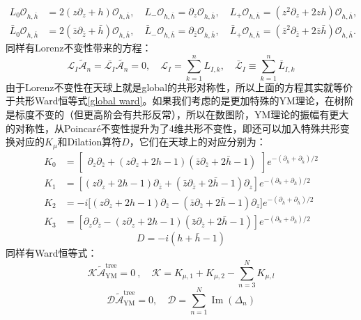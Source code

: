 \begin{equation}
	\begin{aligned}L_0\mathcal{O}_{h,\bar{h}}&=2(z\partial_z+h)\mathcal{O}_{h,\bar{h}},\quad L_-\mathcal{O}_{h,\bar{h}}=\partial_z\mathcal{O}_{h,\bar{h}},\quad L_+\mathcal{O}_{h,\bar{h}}=(z^2\partial_z+2zh)\mathcal{O}_{h,\bar{h}},\\\bar{L}_0\mathcal{O}_{h,\bar{h}}&=2(\bar{z}\partial_{\bar{z}}+\bar{h})\mathcal{O}_{h,\bar{h}},\quad\bar{L}_-\mathcal{O}_{h,\bar{h}}=\partial_{\bar{z}}\mathcal{O}_{h,\bar{h}},\quad\bar{L}_+\mathcal{O}_{h,\bar{h}}=(\bar{z}^2\partial_{\bar{z}}+2\bar{z}\bar{h})\mathcal{O}_{h,\bar{h}}.\end{aligned}
\end{equation}
同样有Lorenz不变性带来的方程：
\begin{equation}\label{50.10}
	\boxed{
		\mathcal{L}_I\widetilde{\mathcal{A}}_n=\bar{\mathcal{L}_I}\widetilde{\mathcal{A}_n}=0,\quad \mathcal{L}_I=\sum_{k=1}^nL_{I,k},\quad\bar{\mathcal{L}}_I\equiv\sum_{k=1}^n\bar{L}_{I,k}
	}
\end{equation}
由于Lorenz不变性在天球上就是global的共形对称性，所以上面的方程其实就等价于共形Ward恒等式\ref{global ward}。如果我们考虑的是更加特殊的YM理论，在树阶是标度不变的（但更高阶会有共形反常），所以在数图阶，YM理论的振幅有更大的对称性，从Poincar\'e不变性提升为了4维共形不变性，即还可以加入特殊共形变换对应的$K_\mu$和Dilation算符$D$，它们在天球上的对应分别为：
\begin{equation}
	\begin{aligned}
		{K_0} &=\begin{bmatrix}\partial_z\partial_{\bar{z}}+(z\partial_z+2h-1)(\bar{z}\partial_{\bar{z}}+2\bar{h}-1)\end{bmatrix}e^{-(\partial_{\bar{h}}+\partial_{\bar{h}})/2} \\
		{K_1}& =\left[(z\partial_z+2h-1)\partial_{\bar{z}}+(\bar{z}\partial_{\bar{z}}+2\bar{h}-1)\partial_z\right]e^{-(\partial_h+\partial_{\bar{h}})/2} \\
		{K_2} &=-i\big[(z\partial_z+2h-1)\partial_{\bar{z}}-(\bar{z}\partial_{\bar{z}}+2\bar{h}-1)\partial_z\big]e^{-(\partial_{\bar{h}}+\partial_{\bar{h}})/2} \\
		{K_3} &=\left[\partial_z\partial_{\bar{z}}-(z\partial_z+2h-1)(\bar{z}\partial_{\bar{z}}+2\bar{h}-1)\right]e^{-(\partial_h+\partial_{\bar{h}})/2}
	\end{aligned}
\end{equation}
\begin{equation}
	D=-i(h+\bar{h}-1)
\end{equation}
同样有Ward恒等式：
\begin{equation}
	\mathcal{K}\widetilde{\mathcal{A}}^{\text{tree}}_\mathrm{YM}=0\mathrm{~},\quad\mathcal{K}=K_{\mu,1}+K_{\mu,2}-\sum_{n=3}^NK_{\mu,l}
\end{equation}
\begin{equation}
	\mathcal{D}\widetilde{\mathcal{A}}_\mathrm{YM}^\text{tree}=0,\quad\mathcal{D}=\sum_{n=1}^N\operatorname{Im}(\Delta_n)
\end{equation}

